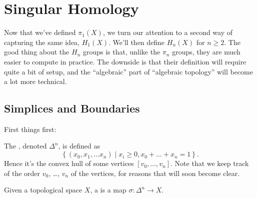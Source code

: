 \chapter{Singular Homology}
Now that we've defined $\pi_1(X)$,
we turn our attention to a second way of capturing the same idea, $H_1(X)$.
We'll then define $H_n(X)$ for $n \ge 2$.
The good thing about the $H_n$ groups is that, unlike the $\pi_n$ groups,
they are much easier to compute in practice.
The downside is that their definition will require quite a bit of setup,
and the ``algebraic'' part of ``algebraic topology'' will become a lot more technical.

\section{Simplices and Boundaries}
First things first:
\begin{definition}
	The , denoted $\Delta^n$, is defined as
	\[ \left\{ (x_0 , x_1, \dots x_n) \mid x_i \ge 0, x_0+\dots+x_n=1 \right\}. \]
	Hence it's the convex hull of some vertices $[v_0, \dots, v_n]$.
	Note that we keep track of the order $v_0$, \dots, $v_n$ of the vertices,
	for reasons that will soon become clear.

	Given a topological space $X$, a  is a map $\sigma : \Delta^n \to X$.
\end{definition}
